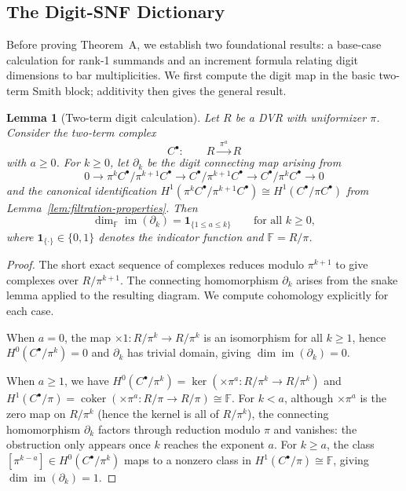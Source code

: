 \documentclass[11pt]{amsart}
\theoremstyle{plain}
\newtheorem{lemma}[theorem]{Lemma}
\theoremstyle{definition}
\newcommand{\Ring}{R}                          %
\newcommand{\unif}{\pi}                        %
\newcommand{\Digit}[1]{\partial_{#1}}%
\DeclareMathOperator{\im}{im}                         %
\DeclareMathOperator{\coker}{coker}                   %
\begin{document}
\subsection{The Digit-SNF Dictionary}
\label{ssec:digit-snf-proof}

Before proving Theorem~A, we establish two foundational results: a base-case calculation for rank-1 summands and an increment formula relating digit dimensions to bar multiplicities. We first compute the digit map in the basic two-term Smith block; additivity then gives the general result.

\begin{lemma}[Two-term digit calculation]
\label{lem:two-term-digit}
Let $\Ring$ be a DVR with uniformizer $\unif$. Consider the two-term complex
\[
C^\bullet:\qquad \Ring \xrightarrow{\;\unif^a\;} \Ring
\]
with $a \ge 0$. For $k \ge 0$, let $\Digit{k}$ be the digit connecting map arising from
\[
0 \to \unif^k C^\bullet/\unif^{k+1} C^\bullet \to C^\bullet/\unif^{k+1} C^\bullet \to C^\bullet/\unif^{k} C^\bullet \to 0
\]
and the canonical identification $H^1(\unif^k C^\bullet/\unif^{k+1} C^\bullet) \cong H^1(C^\bullet/\unif C^\bullet)$ from Lemma~\ref{lem:filtration-properties}. Then
\[
\dim_{\mathbb{F}} \im(\Digit{k}) = \mathbf{1}_{\{1 \le a \le k\}} \qquad \text{for all } k \ge 0,
\]
where $\mathbf{1}_{\{\cdot\}} \in \{0,1\}$ denotes the indicator function and $\mathbb{F} = \Ring/\unif$.
\end{lemma}

\begin{proof}
The short exact sequence of complexes reduces modulo $\unif^{k+1}$ to give complexes over $\Ring/\unif^{k+1}$. The connecting homomorphism $\Digit{k}$ arises from the snake lemma applied to the resulting diagram. We compute cohomology explicitly for each case.

When $a = 0$, the map $\times 1: \Ring/\unif^k \to \Ring/\unif^k$ is an isomorphism for all $k \ge 1$, hence $H^0(C^\bullet/\unif^k) = 0$ and $\Digit{k}$ has trivial domain, giving $\dim \im(\Digit{k}) = 0$.

When $a \ge 1$, we have $H^0(C^\bullet/\unif^k) = \ker(\times \unif^a : \Ring/\unif^k \to \Ring/\unif^k)$ and $H^1(C^\bullet/\unif) = \coker(\times \unif^a : \Ring/\unif \to \Ring/\unif) \cong \mathbb{F}$. For $k < a$, although $\times \unif^a$ is the zero map on $\Ring/\unif^k$ (hence the kernel is all of $\Ring/\unif^k$), the connecting homomorphism $\Digit{k}$ factors through reduction modulo $\unif$ and vanishes: the obstruction only appears once $k$ reaches the exponent $a$. For $k \ge a$, the class $[\unif^{k-a}] \in H^0(C^\bullet/\unif^k)$ maps to a nonzero class in $H^1(C^\bullet/\unif) \cong \mathbb{F}$, giving $\dim \im(\Digit{k}) = 1$.
\end{proof}
\end{document}

